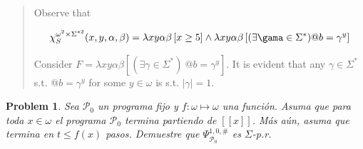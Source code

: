 \documentclass[a4paper, 12pt]{article}
\newtheorem{problem}{Problem}
\newtheorem{problem}{Problem}
\begin{document}
\small
\begin{quote}

Observe that 

\begin{align*}
    \chi_S^{\omega^{2} \times \Sigma^{*2} }(x, y, \alpha, \beta) = \lambda
    xy\alpha\beta \left[ x \geq 5  \right] \land \lambda xy \alpha\beta \left[
    (\exists \gama \in \Sigma^{*}) @b = \gamma^y\right]
\end{align*}

Consider $F = \lambda xy\alpha\beta \left[  (\exists \gamma \in \Sigma^{*}) ~ @b
= \gamma^y \right]$. It is evident that any $\gamma \in \Sigma^{*}$ s.t. $@b =
\gamma^y$ for some $y \in \omega$ is s.t. $|\gamma| = 1$.

\end{quote}
\normalsize

\pagebreak 

\begin{problem}
    Sea $\mathcal{P}_0$ un programa fijo y $f : \omega \mapsto \omega$ una
    función. Asuma que para toda $x \in \omega$ el programa $\mathcal{P}_0$
    termina partiendo de $[\![ x ]\!]$. Más aún, asuma que termina en $t \leq
    f(x)$ pasos. Demuestre que $\Psi_{\mathcal{P}_0}^{1, 0, \#}$ es $\Sigma$-p.r. 
\end{problem}
\end{document}
